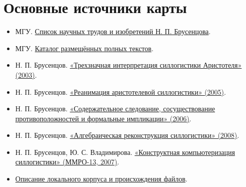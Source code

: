 \documentclass[12pt,a4paper]{article}
\begin{document}
\section{Основные источники карты}

\begin{itemize}
\item МГУ. \href{https://ternarycomp.cs.msu.ru/Brusentsov/Brusentsov_v2.html}{Список научных трудов и изобретений Н. П. Брусенцова}.
\item МГУ. \href{https://ternarycomp.cs.msu.ru/all.html}{Каталог размещённых полных текстов}.
\item Н. П. Брусенцов. \href{https://computer-museum.ru/histussr/trilog0.htm}{«Трехзначная интерпретация силлогистики Аристотеля» (2003)}.
\item Н. П. Брусенцов. \href{https://ternarycomp.cs.msu.ru/Papers/Rea.pdf}{«Реанимация аристотелевой силлогистики» (2005)}.
\item Н. П. Брусенцов. \href{https://ternarycomp.cs.msu.ru/Papers/Soder_sled.pdf}{«Содержательное следование, сосуществование противоположностей и формальные импликации» (2006)}.
\item Н. П. Брусенцов. \href{https://ternarycomp.cs.msu.ru/Papers/Alrek.pdf}{«Алгебраическая реконструкция силлогистики» (2008)}.
\item Н. П. Брусенцов, Ю. С. Владимирова. \href{https://ternarycomp.cs.msu.ru/Papers/MMRO13.pdf}{«Конструктная компьютеризация силлогистики» (ММРО-13, 2007)}.
\item \href{../sources/README.md}{Описание локального корпуса и происхождения файлов}.
\end{itemize}
\end{document}
